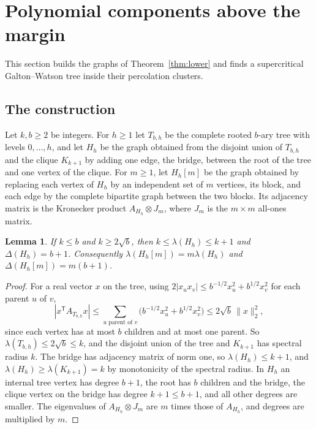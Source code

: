 \documentclass[11pt]{amsart}
\newtheorem{lemma}[theorem]{Lemma}
\theoremstyle{remark}
\begin{document}
\section{Polynomial components above the margin}\label{sec:lower}

This section builds the graphs of Theorem~\ref{thm:lower} and finds a supercritical Galton--Watson tree inside their
percolation clusters.

\subsection{The construction}
Let $k,b\ge2$ be integers. For $h\ge1$ let $T_{b,h}$ be the complete rooted $b$-ary tree with levels $0,\dots,h$, and
let $H_h$ be the graph obtained from the disjoint union of $T_{b,h}$ and the clique $K_{k+1}$ by adding one edge, the
bridge, between the root of the tree and one vertex of the clique. For $m\ge1$, let $H_h[m]$ be the graph obtained by
replacing each vertex of $H_h$ by an independent set of $m$ vertices, its block, and each edge by the complete bipartite
graph between the two blocks. Its adjacency matrix is the Kronecker product $A_{H_h}\otimes J_m$, where $J_m$ is the
$m\times m$ all-ones matrix.

\begin{lemma}\label{lem:spectral}
If $k\le b$ and $k\ge2\sqrt b$, then $k\le\lambda(H_h)\le k+1$ and $\Delta(H_h)=b+1$. Consequently
$\lambda(H_h[m])=m\lambda(H_h)$ and $\Delta(H_h[m])=m(b+1)$.
\end{lemma}

\begin{proof}
For a real vector $x$ on the tree, using $2|x_ux_v|\le b^{-1/2}x_u^2+b^{1/2}x_v^2$ for each parent $u$ of $v$,
\[
|x^{\mathsf T}A_{T_{b,h}}x|\le\sum_{u\text{ parent of }v}\bigl(b^{-1/2}x_u^2+b^{1/2}x_v^2\bigr)\le2\sqrt b\,\|x\|_2^2,
\]
since each vertex has at most $b$ children and at most one parent. So $\lambda(T_{b,h})\le2\sqrt b\le k$, and the
disjoint union of the tree and $K_{k+1}$ has spectral radius $k$. The bridge has adjacency matrix of norm one, so
$\lambda(H_h)\le k+1$, and $\lambda(H_h)\ge\lambda(K_{k+1})=k$ by monotonicity of the spectral radius. In $H_h$ an
internal tree vertex has degree $b+1$, the root has $b$ children and the bridge, the clique vertex on the bridge has
degree $k+1\le b+1$, and all other degrees are smaller. The eigenvalues of $A_{H_h}\otimes J_m$ are $m$ times those of
$A_{H_h}$, and degrees are multiplied by $m$.
\end{proof}
\end{document}
